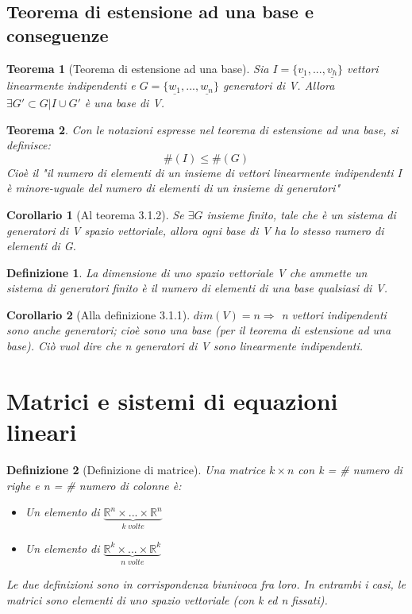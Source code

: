 \documentclass[12pt]{article}
\newenvironment{para}{\begin{adjustwidth}{13mm}{}}{\end{adjustwidth}}
\newtheorem{Definizione}{Definizione}[subsection]
\newtheorem{Corollario}{Corollario}[subsection]
\newtheorem{Teorema}{Teorema}[subsection]
\begin{document}
\begin{para}
\subsection{Teorema di estensione ad una base e conseguenze}
\begin{Teorema}[Teorema di estensione ad una base]
    Sia $I = \{\underline{v_1}, ..., \underline{v_h}\}$ vettori linearmente indipendenti e $G = \{\underline{w_1}, ..., \underline{w_n}\}$ generatori di V. Allora $\exists G'\subset G | I \cup G'$ è una base di V.
\end{Teorema}

\begin{Teorema}
Con le notazioni espresse nel teorema di estensione ad una base, si definisce: $$\#(I) \leq \#(G)$$ Cioè il "il numero di elementi di un insieme di vettori linearmente indipendenti I è minore-uguale del numero di elementi di un insieme di generatori"
\end{Teorema}

\begin{Corollario}[Al teorema 3.1.2]
Se $\exists G$ insieme finito, tale che è un sistema di generatori di V spazio vettoriale, allora ogni base di V ha lo stesso numero di elementi di G.
\end{Corollario}

\begin{Definizione}
La dimensione di uno spazio vettoriale V che ammette un sistema di generatori finito è il numero di elementi di una base qualsiasi di V.
\end{Definizione}

\begin{Corollario}[Alla definizione 3.1.1]
$dim(V) = n \Rightarrow $ n vettori indipendenti sono anche generatori; cioè sono una base (per il teorema di estensione ad una base). Ciò vuol dire che n generatori di V sono linearmente indipendenti.
\end{Corollario}
\section{Matrici e sistemi di equazioni lineari}
\begin{Definizione}[Definizione di matrice]
Una matrice $k \times n$ con k = \# numero di righe e n = \# numero di colonne è:
\begin{itemize}
    \item Un elemento di $\underbrace{\mathbb{R}^n \times ... \times \mathbb{R}^n}_{k \; volte}$
    \item Un elemento di $\underbrace{\mathbb{R}^k \times ... \times \mathbb{R}^k}_{n \; volte}$
\end{itemize}
Le due definizioni sono in corrispondenza biunivoca fra loro. In entrambi i casi, le matrici sono elementi di uno spazio vettoriale (con k ed n fissati).
\end{Definizione}


\end{para}
\end{document}
